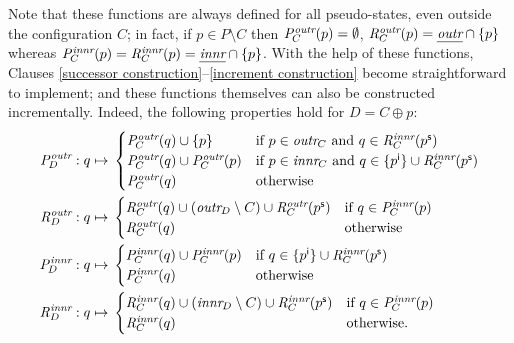 \documentclass{article}
\begin{document}
%
Note that these functions are always defined for all pseudo-states, even outside the configuration $C$; in fact, if $p\in P\setminus C$ then $\PastOut[C](p)= \emptyset$, $ \ReachOut[C](p)=\pOuter\cap \setof p$ whereas $\PastIn[C](p)= \ReachIn[C](p)= \pInner\cap \setof p$. With the help of these functions, Clauses \ref{successor construction}--\ref{increment construction} become straightforward to implement; and these functions themselves can also be constructed incrementally. Indeed, the following properties hold for $D=C\oplus p$:
%
\begin{align*}
\PastOut[D] : q \mapsto {}
 & \begin{cases}
 	\PastOut[C](q) \cup \setof{p} & \text{if } p\in\Outer[C] \text{ and } q\in \ReachIn[C](\scs p) \\
 	\PastOut[C](q) \cup \PastOut[C](p) & \text{if } p\in\Inner[C] \text{ and } q\in \setof{\inc p} \cup \ReachIn[C](\scs p) \\
 	\PastOut[C](q) & \text{otherwise}
 \end{cases} \\
\ReachOut[D] : q \mapsto {}
 & \begin{cases}
   \ReachOut[C](q) \cup (\Outer[D]\setminus C) \cup \ReachOut[C](\scs p) & \text{if } q\in \PastIn[C](p) \\
   \ReachOut[C](q) & \text{otherwise} \\
   \end{cases} \\
\PastIn[D] : q \mapsto {}
& \begin{cases}
	\PastIn[C](q) \cup \PastIn[C](p) & \text{if } q\in \setof{\inc p}\cup \ReachIn[C](\scs p) \\
	\PastIn[C](q) & \text{otherwise}
\end{cases} \\
\ReachIn[D] : q \mapsto {}
& \begin{cases}
	\ReachIn[C](q) \cup (\Inner[D]\setminus C) \cup \ReachIn[C](\scs p) & \text{if } q\in \PastIn[C](p) \\
	\ReachIn[C](q) & \text{otherwise.}
\end{cases}
\end{align*}
%
\end{document}

